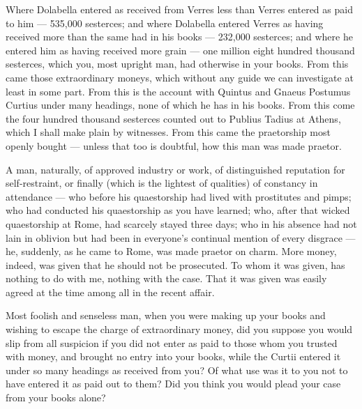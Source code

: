  Where Dolabella entered as received from Verres less than Verres entered as paid to him --- 535,000 sesterces; and where Dolabella entered Verres as having received more than the same had in his books --- 232,000 sesterces; and where he entered him as having received more grain --- one million eight hundred thousand sesterces, which you, most upright man, had otherwise in your books. From this came those extraordinary moneys, which without any guide we can investigate at least in some part. From this is the account with Quintus and Gnaeus Postumus Curtius under many headings, none of which he has in his books. From this come the four hundred thousand sesterces counted out to Publius Tadius at Athens, which I shall make plain by witnesses. From this came the praetorship most openly bought --- unless that too is doubtful, how this man was made praetor.

 A man, naturally, of approved industry or work, of distinguished reputation for self-restraint, or finally (which is the lightest of qualities) of constancy in attendance --- who before his quaestorship had lived with prostitutes and pimps; who had conducted his quaestorship as you have learned; who, after that wicked quaestorship at Rome, had scarcely stayed three days; who in his absence had not lain in oblivion but had been in everyone's continual mention of every disgrace --- he, suddenly, as he came to Rome, was made praetor on charm. More money, indeed, was given that he should not be prosecuted. To whom it was given, has nothing to do with me, nothing with the case. That it was given was easily agreed at the time among all in the recent affair.

 Most foolish and senseless man, when you were making up your books and wishing to escape the charge of extraordinary money, did you suppose you would slip from all suspicion if you did not enter as paid to those whom you trusted with money, and brought no entry into your books, while the Curtii entered it under so many headings as received from you? Of what use was it to you not to have entered it as paid out to them? Did you think you would plead your case from your books alone?

